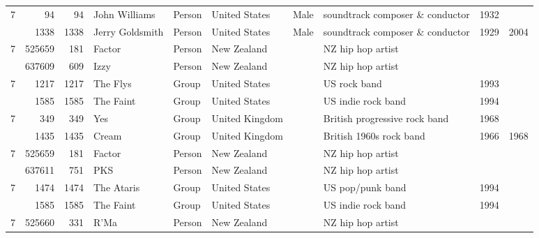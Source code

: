 \begin{tabular}{|r|rrlllllrr|}
\hline
\multirow{2}{*}{7} &     94 &        94 & John Williams         & Person & United States  & Male     & soundtrack composer \& conductor    &         1932 &            \\
         &   1338 &      1338 & Jerry Goldsmith       & Person & United States  & Male     & soundtrack composer \& conductor    &         1929 &       2004 \\
\hline
\multirow{2}{*}{7} & 525659 &       181 & Factor                & Person & New Zealand    &          & NZ hip hop artist                   &              &            \\
         & 637609 &       609 & Izzy                  & Person & New Zealand    &          & NZ hip hop artist                   &              &            \\
\hline
\multirow{2}{*}{7} &   1217 &      1217 & The Flys              & Group  & United States  &          & US rock band                        &         1993 &            \\
         &   1585 &      1585 & The Faint             & Group  & United States  &          & US indie rock band                  &         1994 &            \\
\hline
\multirow{2}{*}{7} &    349 &       349 & Yes                   & Group  & United Kingdom &          & British progressive rock band       &         1968 &            \\
         &   1435 &      1435 & Cream                 & Group  & United Kingdom &          & British 1960s rock band             &         1966 &       1968 \\
\hline
\multirow{2}{*}{7} & 525659 &       181 & Factor                & Person & New Zealand    &          & NZ hip hop artist                   &              &            \\
         & 637611 &       751 & PKS                   & Person & New Zealand    &          & NZ hip hop artist                   &              &            \\
\hline
\multirow{2}{*}{7} &   1474 &      1474 & The Ataris            & Group  & United States  &          & US pop/punk band                    &         1994 &            \\
         &   1585 &      1585 & The Faint             & Group  & United States  &          & US indie rock band                  &         1994 &            \\
\hline
\multirow{2}{*}{7} & 525660 &       331 & R'Ma                  & Person & New Zealand    &          & NZ hip hop artist                   &              &            \\

\end{tabular}
